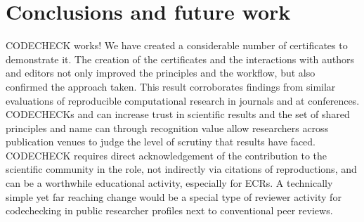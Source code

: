 \documentclass[12pt]{article}
\begin{document}
\section*{Conclusions and future work}\label{future-work-and-conclusions}

CODECHECK works!
We have created a considerable number of certificates to demonstrate it.
The creation of the certificates and the interactions with authors and
editors not only improved the principles and the workflow, but also
confirmed the approach taken. This result corroborates findings from
similar evaluations of reproducible computational research in journals and
at conferences.
CODECHECKs and can increase trust in scientific results and the set of 
shared principles and name can through recognition value allow researchers
across publication venues to judge the level of scrutiny that results have
faced. CODECHECK requires direct acknowledgement of the contribution to the
scientific community in the role, not indirectly via citations of 
reproductions, and can be a worthwhile educational activity, especially for
ECRs. A technically simple yet far reaching change would be a special type of 
reviewer activity for codechecking in public researcher profiles next to
conventional peer reviews.
\end{document}

